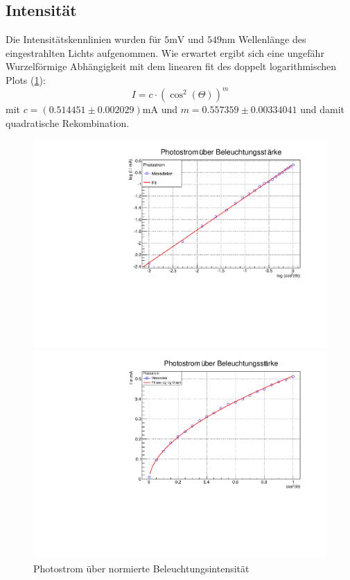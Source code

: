 \FloatBarrier

\newpage

\subsection{Intensität}

Die Intensitätskennlinien wurden für $5 \text{mV}$ und $ 549 \text{nm}$ Wellenlänge des eingestrahlten Lichts  aufgenommen. 
Wie erwartet ergibt sich eine ungefähr Wurzelförmige Abhängigkeit mit dem linearen fit des doppelt logarithmischen Plots (\ref{fig:A2}):
$$I = c \cdot (\cos^2(\Theta) )^{m}$$
mit $c = (0.514451 \pm 0.002029) \text{mA} $ und $m = 0.557359 \pm 0.00334041$
und damit quadratische Rekombination.

\begin{figure}[hb]
\label{fig:A2}
\centering
\includegraphics[scale=0.4]{../A2/A2_log.pdf}

\includegraphics[scale=0.4]{../A2/A2_lin.pdf}

\caption{Photostrom über normierte Beleuchtungsintensität}
\end{figure}

